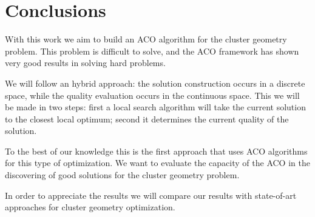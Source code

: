 \chapter{Conclusions}
\label{chap:conclusions}

With this work we aim to build an ACO algorithm for the cluster geometry problem. This problem is difficult to solve, and the ACO framework has shown very good results in solving hard problems. 

We will follow an hybrid approach: the solution construction occurs in a discrete space, while the quality evaluation occurs in the continuous space. This we will be made in two steps: first a local search algorithm will take the current solution to the closest local optimum; second it determines the current quality of the solution.

To the best of our knowledge this is the first approach that uses ACO algorithms for this type of optimization. We want to evaluate the capacity of the ACO in the discovering of good solutions for the cluster geometry problem.

In order to appreciate the results we will compare our results with state-of-art approaches for cluster geometry optimization.
